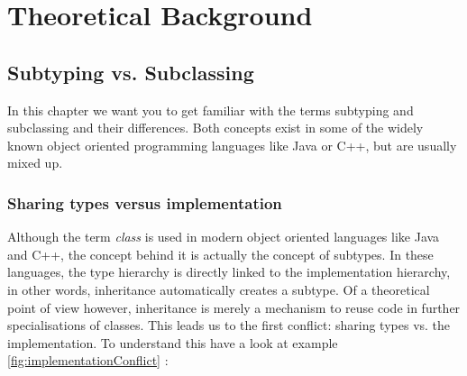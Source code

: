 
\part{Theoretical Background}
\chapter{Subtyping vs. Subclassing}
In this chapter we want you to get familiar with the terms subtyping
and subclassing and their differences. Both concepts exist in some of
the widely known object oriented programming languages like Java or C++, but are
usually mixed up.


\section{Sharing types versus implementation}
Although the term \emph{class} is used in modern object oriented languages
like Java and C++, the concept behind it is actually the concept of subtypes.
In these languages, the type hierarchy is directly linked
to the implementation hierarchy, in other words, inheritance automatically 
creates a subtype. Of a theoretical point of view however, inheritance is merely
a mechanism to reuse code in further specialisations of classes. This leads us
to the first conflict: sharing types vs. the implementation. To understand this
have a look at example \ref{fig:implementationConflict} \cite{simons_theory_2003-4}: %

